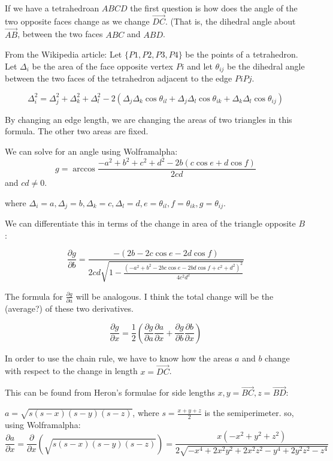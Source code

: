 \documentclass[11pt]{article}
\begin{document}
If we have a tetrahedroan $ABCD$ the first question is how does the angle of the
two opposite faces change as we change $\overrightarrow{DC}$. (That is, the dihedral
angle about $\overrightarrow{AB}$, between the two faces $ABC$ and $ABD$.

From the Wikipedia article:
Let $\{P1 ,P2, P3, P4\}$ be the points of a tetrahedron. Let $\Delta_i$ be the area
of the face opposite vertex $Pi$ and let $\theta_{ij}$ be the dihedral angle between
the two faces of the tetrahedron adjacent to the edge $PiPj$.

\[
\Delta _{i}^{2}=\Delta _{j}^{2}+\Delta _{k}^{2}+\Delta _{l}^{2}-2(\Delta _{j}\Delta _{k}\cos \theta _{il}+\Delta _{j}\Delta _{l}\cos \theta _{ik}+\Delta _{k}\Delta _{l}\cos \theta _{ij})
\]

By changing an edge length, we are changing the areas of two triangles in this formula.
The other two areas are fixed.

We can solve for an angle using Wolframalpha:
\[
g = \arccos{\frac{-a^2 + b^2  + c^2 + d^2 - 2 b (c \cos{e} + d \cos{f})}{2 c d}}
\]
and $c d \neq 0 $.

where $\Delta _{i}=a,\Delta _{j}=b,\Delta _{k}=c,\Delta _{l}=d,e=\theta_{il},f=\theta_{ik},g=\theta_{ij}$.

We can differentiate this in terms of the change in area of the triangle opposite $B$:

\[
\frac{\partial g}{\partial b} = \frac{-(2 b - 2 c \cos{e} - 2 d \cos{f})}
     {2 c d \sqrt{1 - \frac{(-a^2 + b^2 - 2 b c \cos{e} - 2 b d \cos{f} + c^2 + d^2)^2}{4 c^2 d^2}}}
\]

The formula for $\frac{\partial g}{\partial a}$ will be analogous.
I think the total change will be the (average?) of these two derivatives.

\[
\frac{\partial g}{\partial x} = \frac{1}{2} (\frac{\partial g}{\partial a} \frac{\partial a}{\partial x} + \frac{\partial g}{\partial b} \frac{\partial b}{\partial x})
\]

In order to use the chain rule, we have to know how the areas $a$  and $b$ change with
respect to the change in length $x =\overrightarrow{DC}$.

This can be found from Heron's formulae for side lengths
$x,y = \overrightarrow{BC}, z = \overrightarrow{BD}$:

$ a = \sqrt{s(s-x)(s-y)(s-z)} $, where $s = \frac{x+y+z}{2}$ is the semiperimeter.
so, using Wolframalpha:
\[
\frac{\partial a}{\partial x} =
\frac{\partial }{\partial x} (\sqrt{s(s-x)(s-y)(s-z)})
= \frac{x(-x^2+y^2+z^2)}{2\sqrt{-x^4 + 2 x^2y^2 + 2x^2z^2-y^4+2y^2z^2-z^4}}
\]
\end{document}
